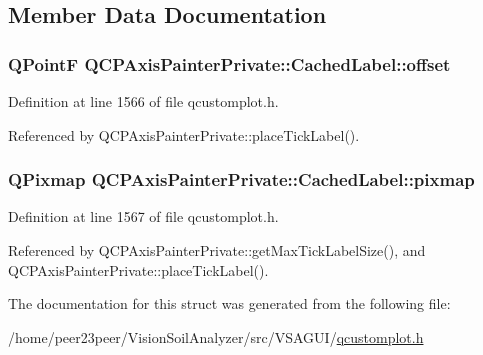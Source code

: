 \subsection{Member Data Documentation}
\hypertarget{struct_q_c_p_axis_painter_private_1_1_cached_label_a5f502db71c92e572f1e6f44f62c59d8e}{}
\subsubsection[{offset}]{\setlength{\rightskip}{0pt plus 5cm}Q\+Point\+F Q\+C\+P\+Axis\+Painter\+Private\+::\+Cached\+Label\+::offset}\label{struct_q_c_p_axis_painter_private_1_1_cached_label_a5f502db71c92e572f1e6f44f62c59d8e}


Definition at line 1566 of file qcustomplot.\+h.



Referenced by Q\+C\+P\+Axis\+Painter\+Private\+::place\+Tick\+Label().

\hypertarget{struct_q_c_p_axis_painter_private_1_1_cached_label_a461597cbd470914a9d24b64d16037a88}{}
\subsubsection[{pixmap}]{\setlength{\rightskip}{0pt plus 5cm}Q\+Pixmap Q\+C\+P\+Axis\+Painter\+Private\+::\+Cached\+Label\+::pixmap}\label{struct_q_c_p_axis_painter_private_1_1_cached_label_a461597cbd470914a9d24b64d16037a88}


Definition at line 1567 of file qcustomplot.\+h.



Referenced by Q\+C\+P\+Axis\+Painter\+Private\+::get\+Max\+Tick\+Label\+Size(), and Q\+C\+P\+Axis\+Painter\+Private\+::place\+Tick\+Label().



The documentation for this struct was generated from the following file\+:\begin{DoxyCompactItemize}
\item 
/home/peer23peer/\+Vision\+Soil\+Analyzer/src/\+V\+S\+A\+G\+U\+I/\hyperlink{qcustomplot_8h}{qcustomplot.\+h}\end{DoxyCompactItemize}
